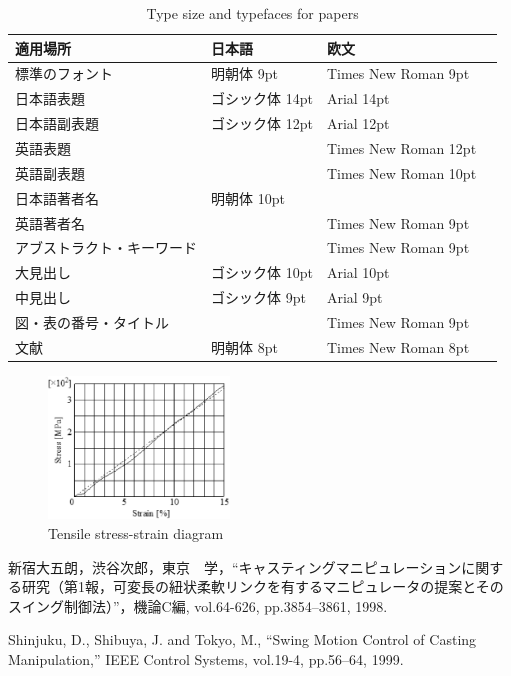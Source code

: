 \documentclass{bxjsarticle} %
\begin{document}
\begin{table}[tb]
 \caption{Type size and typefaces for papers}
 \label{tbl: table1}
 \centering
 \footnotesize
 \begin{tabular}{|p{7\zw}|l|l|l|}
  \hline
	適用場所	&日本語	&欧文 \\\hline
	標準のフォント	&明朝体 9pt	&Times New Roman 9pt \\\hline
	日本語表題	&ゴシック体 14pt	&Arial 14pt \\\hline
	日本語副表題	&ゴシック体 12pt	&Arial 12pt \\\hline
	英語表題	&&Times New Roman 12pt \\\hline
	英語副表題	&&Times New Roman 10pt \\\hline
	日本語著者名	&明朝体 10pt &\\\hline
	英語著者名	&&Times New Roman 9pt \\\hline
	アブストラクト・キーワード	&&Times New Roman 9pt \\\hline
	大見出し	&ゴシック体 10pt	&Arial 10pt \\\hline
	中見出し	&ゴシック体 9pt	&Arial 9pt \\\hline
	図・表の番号・タイトル	 &&Times New Roman 9pt \\\hline
	文献	&明朝体 8pt	&Times New Roman 8pt \\
  \hline
 \end{tabular}
\end{table}

\begin{figure}[tb]
 \centering
  \includegraphics[height=38mm]{fig1.eps}
  \vspace*{-4mm}
  \caption{Tensile stress-strain diagram}
  \label{fig: fig1}
\end{figure}


\footnotesize
\begin{thebibliography}{99}

新宿大五朗，渋谷次郎，東京　学，``キャスティングマニピュレーションに関する研究（第1報，可変長の紐状柔軟リンクを有するマニピュレータの提案とそのスイング制御法）''，機論C編, vol.64-626, pp.3854--3861, 1998.

Shinjuku, D., Shibuya, J. and Tokyo, M., ``Swing Motion Control of Casting Manipulation,'' IEEE Control Systems, vol.19-4, pp.56--64, 1999.

\end{thebibliography}

\normalsize
\end{document}
